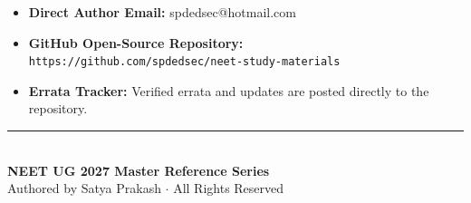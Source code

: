 \documentclass[10pt,twoside,openright]{book}
\begin{document}
\begin{itemize}
  \item \textbf{Direct Author Email:} spdedsec@hotmail.com
  \item \textbf{GitHub Open-Source Repository:}\\ \nolinkurl{https://github.com/spdedsec/neet-study-materials}
  \item \textbf{Errata Tracker:} Verified errata and updates are posted directly to the repository.
\end{itemize}

\vspace{1.5cm}
\begin{center}
  \rule{0.6\textwidth}{0.6pt}\\[6pt]
  {\small\textbf{\color{primarydark}NEET UG 2027 Master Reference Series}}\\[2pt]
  {\footnotesize\color{gray}Authored by Satya Prakash $\cdot$ All Rights Reserved}
\end{center}
\end{document}

